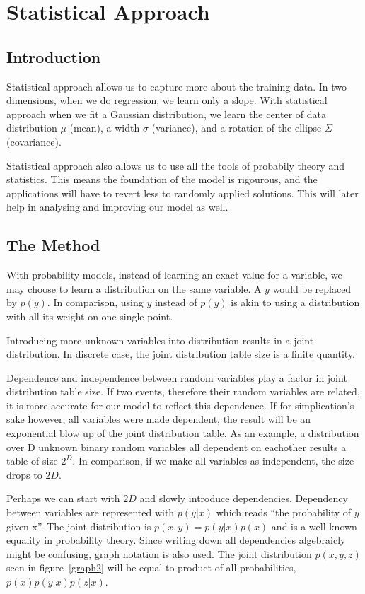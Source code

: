 \documentclass{ecctd01} %
\begin{document}
\section{Statistical Approach}

\subsection{Introduction}

Statistical approach allows us to capture more about the training
data. In two dimensions, when we do regression, we learn only a slope. With 
statistical approach when we fit a Gaussian distribution, we learn
the center of data distribution $\mu$ (mean), a width $\sigma$
(variance), and a rotation of the ellipse $\Sigma$ (covariance).  

Statistical approach also allows us to use all the tools of probabily theory and
statistics. This means the foundation of the model is rigourous, and the
applications will have to revert less to randomly applied solutions. This will
later help in analysing and improving our model as well. 

\subsection{The Method}

With probability models, instead of learning an exact value for a
variable, we may choose to learn a distribution on the same variable. A $y$
would be replaced by $p(y)$. In comparison, using $y$ instead of $p(y)$ is akin
to using a distribution with all its weight on one single point.

Introducing more unknown variables into distribution results in a joint
distribution. In discrete case, the joint distribution table size is a finite
quantity.

Dependence and independence between random variables play a factor in
joint distribution table size. If two events, therefore their random variables
are related, it is more accurate for our model to reflect this dependence. If
for simplication's sake however, all variables were made dependent, the result
will be an exponential blow up of the joint distribution table. As an example, a
distribution over D unknown binary random variables all dependent on
eachother results a table of size $2^D$. In comparison, if we make all
variables as independent, the size drops to $2D$. 

Perhaps we can start with $2D$ and slowly introduce
dependencies. Dependency between variables are represented with
$p(y|x)$ which reads ``the probability of $y$ given x''. The joint
distribution is $p(x,y) = p(y|x)p(x)$ and is a well known equality in
probability theory. Since writing down all dependencies algebraicly
might be confusing, graph notation is also used. The joint
distribution $p(x,y,z)$ seen in figure~\ref{graph2} will be equal to
product of all probabilities, $p(x)p(y|x)p(z|x)$.  
\end{document}

